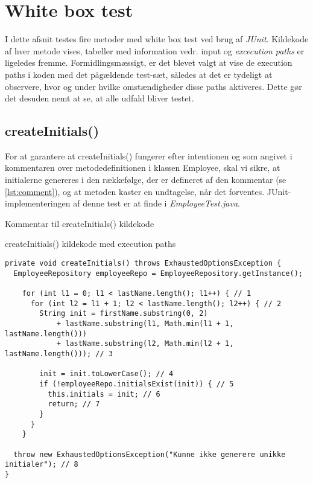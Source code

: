 \section{White box test\label{chap:white_box}}
I dette afsnit testes fire metoder med white box test ved brug af \textit{JUnit}. Kildekode af hver metode vises, tabeller med information vedr. input og \textit{excecution paths} er ligeledes fremme. Formidlingsmæssigt, er det blevet valgt at vise de execution paths i koden med det pågældende test-sæt, således at det er tydeligt at observere, hvor og under hvilke omstændigheder disse paths aktiveres. Dette gør det desuden nemt at se, at alle udfald bliver testet.
\subsection{createInitials()}\label{sec:white_box_create_initials}
For at garantere at createInitials() fungerer efter intentionen og som angivet i kommentaren over metodedefinitionen i klassen Employee, skal vi sikre, at initialerne genereres i den rækkefølge, der er defineret af den kommentar (se \cref{lst:comment}), og at metoden kaster en undtagelse, når det forventes. JUnit-implementeringen af denne test er at finde i \textit{EmployeeTest.java}.
\begin{listing}[H]
  \centering
  \caption{Kommentar til createInitials() kildekode}\label{lst:comment}
\end{listing}
\begin{listing}[H]
  \centering
  \caption{createInitials() kildekode med execution paths}\label{lst:create_initials_source}
  \begin{verbatim}
private void createInitials() throws ExhaustedOptionsException {
  EmployeeRepository employeeRepo = EmployeeRepository.getInstance();

    for (int l1 = 0; l1 < lastName.length(); l1++) { // 1
      for (int l2 = l1 + 1; l2 < lastName.length(); l2++) { // 2
        String init = firstName.substring(0, 2)
            + lastName.substring(l1, Math.min(l1 + 1, lastName.length()))
            + lastName.substring(l2, Math.min(l2 + 1, lastName.length())); // 3

        init = init.toLowerCase(); // 4
        if (!employeeRepo.initialsExist(init)) { // 5
          this.initials = init; // 6
          return; // 7
        }
      }
    }

  throw new ExhaustedOptionsException("Kunne ikke generere unikke initialer"); // 8
}
    \end{verbatim}
\end{listing}
